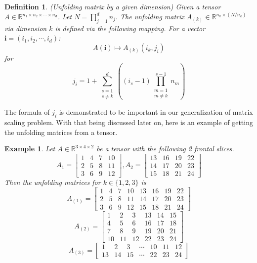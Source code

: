 \documentclass{article}
\newtheorem{definition}{Definition}[section]
\newtheorem{example}{Example}[section]
\begin{document}
\begin{definition}{(Unfolding matrix by a given dimension)} Given a tensor $A \in \mathbb{R}^{n_1 \times n_2 \times \cdots \times n_d}$. Let $N = \prod^d_{j=1} n_j.$ The unfolding matrix $A_{(k)} \in \mathbb{R}^{n_k\times (N/n_k)}$ via dimension $k$ is defined via the following mapping. For a vector $\textbf{i} = (i_1, i_2, \cdots, i_d)$:
$$A (\textbf{i}) \mapsto A_{(k)} (i_k, j_i)$$
for 
\begin{equation}
    j_i = 1 + \sum\limits_{\substack{s=1 \\ s\neq k}}^d \left( (i_s - 1) \prod\limits_{\substack{m=1 \\ m\neq k}}^{s-1} n_m \right)
\end{equation}{}
\label{getthej_i}
\end{definition}{}
The formula of $j_i$ is demonstrated to be important in our generalization of matrix scaling problem. With that being discussed later on, here is an example of getting the unfolding matrices from a tensor.
\begin{example}
\label{unfoldingmatrix}
Let $A \in \mathbb{R}^{3\times 4\times 2}$ be a tensor with the following 2 frontal slices.
\begin{equation}
 A_1 = \begin{bmatrix}
    1 & 4 & 7 & 10 \\
    2 & 5 & 8 & 11 \\
    3 & 6 & 9 & 12
\end{bmatrix}
, A_2 =  
\begin{bmatrix}
    13 & 16 & 19 & 22 \\
    14 & 17 & 20 & 23 \\
    15 & 18 & 21 & 24
\end{bmatrix} 
\end{equation}
Then the unfolding matrices for $k \in \{1,2,3\}$ is 
\begin{equation}
    A_{(1)} = \begin{bmatrix}
    1 & 4 & 7 & 10 & 13 & 16 & 19 & 22 \\
    2 & 5 & 8 & 11 & 14 & 17 & 20 & 23 \\
    3 & 6 & 9 & 12 & 15 & 18 & 21 & 24
    \end{bmatrix}{}
\end{equation}
\begin{equation}{}
    A_{(2)} = \begin{bmatrix}
    1 & 2 & 3 & 13 & 14 & 15 \\
    4 & 5 & 6 & 16 & 17 & 18 \\
    7 & 8 & 9 & 19 & 20 & 21 \\
    10 & 11 & 12 & 22 & 23 & 24
    \end{bmatrix}{}
\end{equation}
\begin{equation}{}
    A_{(3)} = \begin{bmatrix}
    1 & 2 & 3 & \cdots & 10 & 11 & 12 \\
    13 & 14 & 15 & \cdots & 22 & 23 & 24
    \end{bmatrix}{}
\end{equation}
\end{example}
\end{document}
